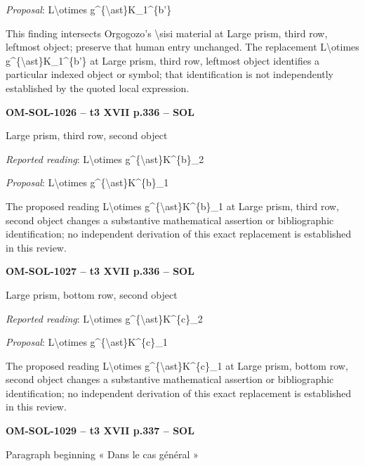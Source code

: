 \emph{Proposal}: L\textbackslash{}otimes g\textasciicircum{}\{\textbackslash{}ast\}K\_1\textasciicircum{}\{b'\}\par
This finding intersects Orgogozo's \textbackslash{}sisi material at Large prism, third row, leftmost object; preserve that human entry unchanged. The replacement L\textbackslash{}otimes g\textasciicircum{}\{\textbackslash{}ast\}K\_1\textasciicircum{}\{b'\} at Large prism, third row, leftmost object identifies a particular indexed object or symbol; that identification is not independently established by the quoted local expression.\par
\par\noindent\textbf{OM-SOL-1026 -- t3 XVII p.336 -- SOL}\par
Large prism, third row, second object\par
\emph{Reported reading}: L\textbackslash{}otimes g\textasciicircum{}\{\textbackslash{}ast\}K\textasciicircum{}\{b\}\_2\par
\emph{Proposal}: L\textbackslash{}otimes g\textasciicircum{}\{\textbackslash{}ast\}K\textasciicircum{}\{b\}\_1\par
The proposed reading L\textbackslash{}otimes g\textasciicircum{}\{\textbackslash{}ast\}K\textasciicircum{}\{b\}\_1 at Large prism, third row, second object changes a substantive mathematical assertion or bibliographic identification; no independent derivation of this exact replacement is established in this review.\par
\par\noindent\textbf{OM-SOL-1027 -- t3 XVII p.336 -- SOL}\par
Large prism, bottom row, second object\par
\emph{Reported reading}: L\textbackslash{}otimes g\textasciicircum{}\{\textbackslash{}ast\}K\textasciicircum{}\{c\}\_2\par
\emph{Proposal}: L\textbackslash{}otimes g\textasciicircum{}\{\textbackslash{}ast\}K\textasciicircum{}\{c\}\_1\par
The proposed reading L\textbackslash{}otimes g\textasciicircum{}\{\textbackslash{}ast\}K\textasciicircum{}\{c\}\_1 at Large prism, bottom row, second object changes a substantive mathematical assertion or bibliographic identification; no independent derivation of this exact replacement is established in this review.\par
\par\noindent\textbf{OM-SOL-1029 -- t3 XVII p.337 -- SOL}\par
Paragraph beginning « Dans le cas général »\par
